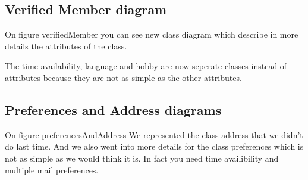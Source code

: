 \documentclass[11pt, a4paper]{article}   	%
\begin{document}
\subsection{Verified Member diagram}


On figure {verifiedMember} you can see new class diagram which describe in more details the attributes of the class.

The time availability, language and hobby are now seperate classes instead of attributes because they are not as simple as the other
attributes. 

\subsection{Preferences and Address diagrams}


On figure {preferencesAndAddress} We represented the class address that we didn't do last time. And we also went into more details
for the class preferences which is not as simple as we would think it is. In fact you need time availibility and multiple mail preferences.
\end{document}
